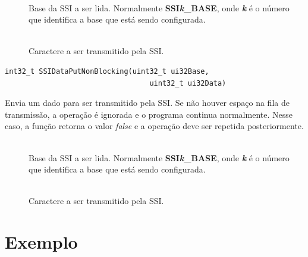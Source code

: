 \begin{description}
	\item []\hfill \\
	Base da SSI a ser lida. Normalmente \textbf{SSI\emph{k}\_BASE}, onde \textbf{\emph{k}} é o número que identifica a base que está sendo configurada.
	
	\item []\hfill \\
	Caractere a ser transmitido pela SSI.
\end{description}

\begin{lstlisting}[style=funcao]
	int32_t SSIDataPutNonBlocking(uint32_t ui32Base,
								  uint32_t ui32Data)
\end{lstlisting}

Envia um dado para ser transmitido pela SSI. Se não houver espaço na fila de transmissão, a operação é ignorada e o programa continua normalmente. Nesse caso, a função retorna o valor \emph{false} e a operação deve ser repetida posteriormente.

\begin{description}
	\item []\hfill \\
	Base da SSI a ser lida. Normalmente \textbf{SSI\emph{k}\_BASE}, onde \textbf{\emph{k}} é o número que identifica a base que está sendo configurada.
	
	\item []\hfill \\
	Caractere a ser transmitido pela SSI.
\end{description}


\section{Exemplo}



